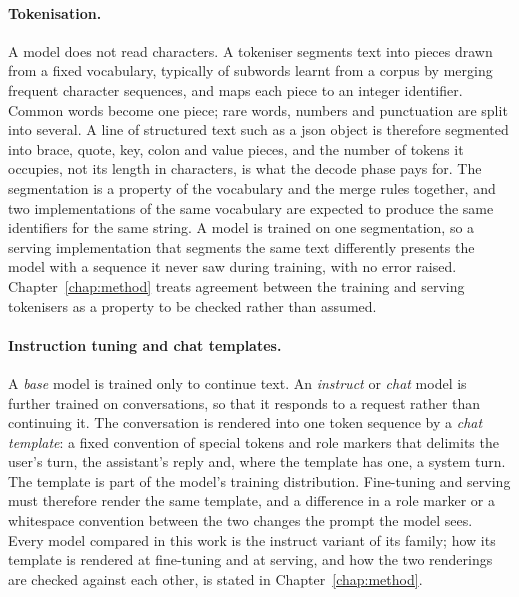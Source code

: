 \paragraph{Tokenisation.} A model does not read characters. A tokeniser segments text into pieces
drawn from a fixed vocabulary, typically of subwords learnt from a corpus by merging frequent
character sequences, and maps each piece to an integer identifier. Common words become one piece;
rare words, numbers and punctuation are split into several. A line of structured text such as a
\gls{json} object is therefore segmented into brace, quote, key, colon and value pieces, and the
number of tokens it occupies, not its length in characters, is what the decode phase pays for.
The segmentation is a property of the vocabulary and the merge rules together, and two
implementations of the same vocabulary are expected to produce the same identifiers for the same
string. A model is trained on one segmentation, so a serving implementation that segments the same
text differently presents the model with a sequence it never saw during training, with no error
raised. Chapter~\ref{chap:method} treats agreement between the training and serving tokenisers as
a property to be checked rather than assumed.

\paragraph{Instruction tuning and chat templates.} A \emph{base} model is trained only to
continue text. An \emph{instruct} or \emph{chat} model is further trained on conversations, so
that it responds to a request rather than continuing it. The conversation is rendered into one
token sequence by a \emph{chat template}: a fixed convention of special tokens and role markers
that delimits the user's turn, the assistant's reply and, where the template has one, a system
turn. The template is part of
the model's training distribution. Fine-tuning and serving must therefore render the same
template, and a difference in a role marker or a whitespace convention between the two changes
the prompt the model sees. Every model compared in this work is the instruct variant of its
family; how its template is rendered at fine-tuning and at serving, and how the two renderings are
checked against each other, is stated in Chapter~\ref{chap:method}.

